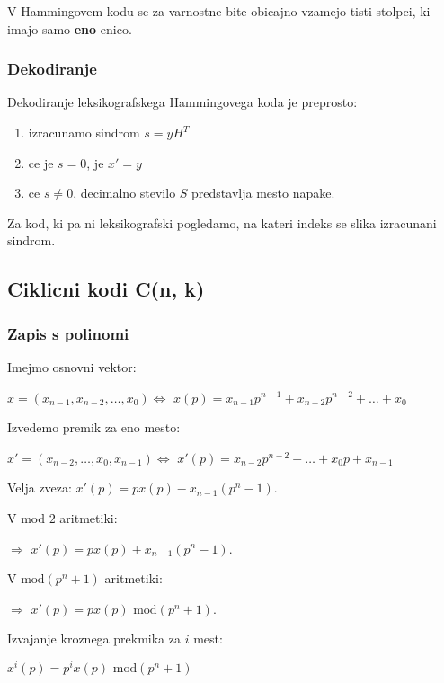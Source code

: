 \documentclass{article}
\begin{document}
\begin{multicols}{4}
 V Hammingovem kodu se za varnostne bite obicajno vzamejo tisti stolpci, ki imajo samo \textbf{eno} enico.

\subsubsection{Dekodiranje}
Dekodiranje leksikografskega Hammingovega koda je preprosto:
\begin{enumerate}
    \item izracunamo sindrom $s = yH^T$
    \item ce je $s = 0$, je $x' = y$
    \item ce $s \neq 0$, decimalno stevilo $S$ predstavlja mesto napake.
\end{enumerate}
Za kod, ki pa ni leksikografski pogledamo, na kateri indeks se slika izracunani sindrom.

\subsection{Ciklicni kodi C(n, k)}

\subsubsection{Zapis s polinomi}
Imejmo osnovni vektor: 
\begin{center}
    $x = (x_{n-1}, x_{n-2}, \dots, x_0) \Leftrightarrow$
    $x(p) = x_{n-1}p^{n-1} + x_{n-2}p^{n-2} + \dots + x_0$ 
\end{center}
Izvedemo premik za eno mesto:
\begin{center}
    $x' = (x_{n-2}, \dots, x_0, x_{n-1}) \Leftrightarrow$
    $x'(p) = x_{n-2}p^{n-2} + \dots + x_0p + x_{n-1}$ 
\end{center}
Velja zveza: $x'(p) = px(p) - x_{n-1}(p^n -1)$.

V mod $2$ aritmetiki:
\begin{center}
    $\Rightarrow$ $x'(p) = px(p) + x_{n-1}(p^n -1)$.
\end{center}

V $\text{mod}(p^n + 1)$ aritmetiki:
\begin{center}
    $\Rightarrow$ $x'(p) = px(p) \text{ mod}(p^n + 1)$.
\end{center}

Izvajanje kroznega prekmika za $i$ mest:
\begin{center}
    \begin{math}
        x^i(p) = p^i x(p) \text{ mod} (p^n + 1)
    \end{math}
\end{center}


\end{multicols}
\end{document}

